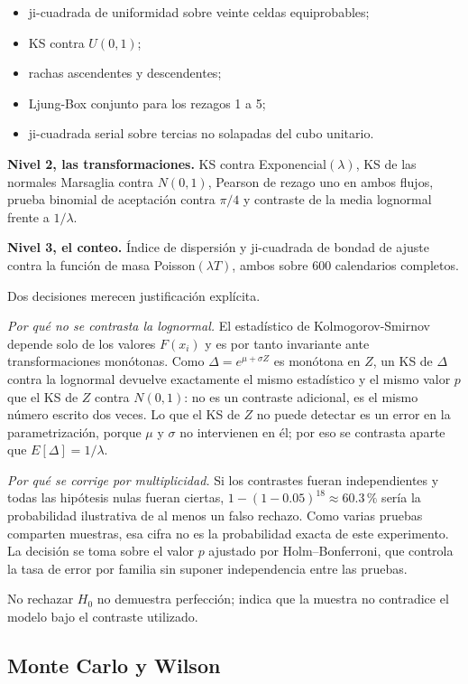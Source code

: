\documentclass[11pt,a4paper]{article}
\begin{document}
\begin{itemize}
  \item ji-cuadrada de uniformidad sobre veinte celdas equiprobables;
  \item KS contra $U(0,1)$;
  \item rachas ascendentes y descendentes;
  \item Ljung-Box conjunto para los rezagos 1 a 5;
  \item ji-cuadrada serial sobre tercias no solapadas del cubo unitario.
\end{itemize}

\textbf{Nivel 2, las transformaciones.} KS contra Exponencial$(\lambda)$, KS de
las normales Marsaglia contra $N(0,1)$, Pearson de rezago uno en ambos flujos,
prueba binomial de aceptación contra $\pi/4$ y contraste de la media lognormal
frente a $1/\lambda$.

\textbf{Nivel 3, el conteo.} Índice de dispersión y ji-cuadrada de bondad de
ajuste contra la función de masa Poisson$(\lambda T)$, ambos sobre 600
calendarios completos.

Dos decisiones merecen justificación explícita.

\emph{Por qué no se contrasta la lognormal.} El estadístico de Kolmogorov-Smirnov
depende solo de los valores $F(x_i)$ y es por tanto invariante ante
transformaciones monótonas. Como $\Delta=e^{\mu+\sigma Z}$ es monótona en $Z$, un
KS de $\Delta$ contra la lognormal devuelve exactamente el mismo estadístico y el
mismo valor $p$ que el KS de $Z$ contra $N(0,1)$: no es un contraste adicional,
es el mismo número escrito dos veces. Lo que el KS de $Z$ no puede detectar es un
error en la parametrización, porque $\mu$ y $\sigma$ no intervienen en él; por eso
se contrasta aparte que $E[\Delta]=1/\lambda$.

\emph{Por qué se corrige por multiplicidad.} Si los \TestCount{} contrastes
fueran independientes y todas las hipótesis nulas fueran ciertas,
$1-(1-0.05)^{18}\approx60.3\,\%$ sería la probabilidad ilustrativa de al menos
un falso rechazo. Como varias pruebas comparten muestras, esa cifra no es la
probabilidad exacta de este experimento. La decisión se toma sobre el valor $p$
ajustado por Holm--Bonferroni, que controla la tasa de error por familia sin
suponer independencia entre las pruebas.

No rechazar $H_0$ no demuestra perfección; indica que la muestra no contradice
el modelo bajo el contraste utilizado.

\subsection{Monte Carlo y Wilson}
\end{document}
